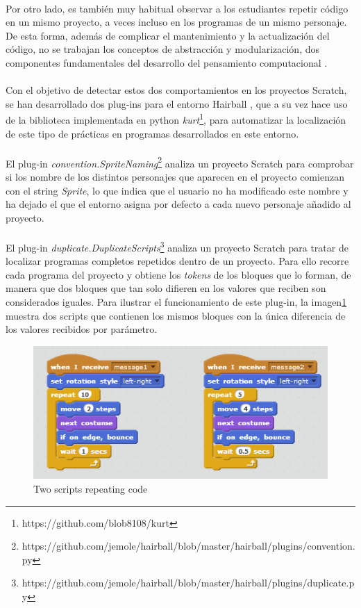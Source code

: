 \documentclass[a4paper,10pt]{article}
\begin{document}
\paragraph{}Por otro lado, es también muy habitual observar a los estudiantes repetir código en un mismo proyecto, a veces incluso en los programas de un mismo personaje. De esta forma, además de complicar el mantenimiento y la actualización del código, no se trabajan los conceptos de abstracción y modularización, dos componentes fundamentales del desarrollo del pensamiento computacional \cite{wing2008computational}.
\paragraph{}Con el objetivo de detectar estos dos comportamientos en los proyectos Scratch, se han desarrollado dos plug-ins para el entorno Hairball \cite{boe2013hairball}, que a su vez hace uso de la biblioteca implementada en python \textit{kurt}\footnote{https://github.com/blob8108/kurt}, para automatizar la localización de este tipo de prácticas en programas desarrollados en este entorno.
\paragraph{}El plug-in \textit{convention.SpriteNaming}\footnote{https://github.com/jemole/hairball/blob/master/hairball/plugins/convention.py} analiza un proyecto Scratch para comprobar si los nombre de los distintos personajes que aparecen en el proyecto comienzan con el string \textit{Sprite}, lo que indica que el usuario no ha modificado este nombre y ha dejado el que el entorno asigna por defecto a cada nuevo personaje añadido al proyecto.
\paragraph{}El plug-in \textit{duplicate.DuplicateScripts}\footnote{https://github.com/jemole/hairball/blob/master/hairball/plugins/duplicate.py} analiza un proyecto Scratch para tratar de localizar programas completos repetidos dentro de un proyecto. Para ello recorre cada programa del proyecto y obtiene los \textit{tokens} de los bloques que lo forman, de manera que dos bloques que tan solo difieren en los valores que reciben son considerados iguales. Para ilustrar el funcionamiento de este plug-in, la imagen\ref{fig:CodeRepetition1} muestra dos scripts que contienen los mismos bloques con la única diferencia de los valores recibidos por parámetro. 
\begin{figure}
  \centering
    \includegraphics{img/CodeRepetition1.png}
  \caption{Two scripts repeating code}
  \label{fig:CodeRepetition1}
\end{figure}
\end{document}
